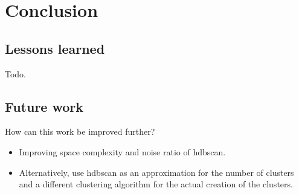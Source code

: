 \section{Conclusion}

\subsection{Lessons learned}
Todo.

\subsection{Future work}

How can this work be improved further?

\begin{itemize}
    \item Improving space complexity and noise ratio of hdbscan.
    \item Alternatively, use hdbscan as an approximation for the number of clusters and a different clustering algorithm
    for the actual creation of the clusters.
\end{itemize}
